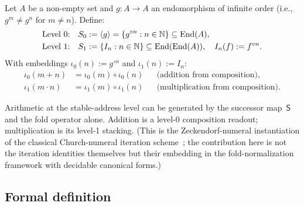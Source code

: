 \begin{theorem}
\label{thm:two-level}
Let $A$ be a non-empty set and $g \colon A \to A$ an endomorphism
of infinite order (i.e., $g^{m} \neq g^{n}$ for $m \neq n$).
Define:
\begin{align}
  \text{Level 0:} &\quad S_{0} := \langle g \rangle
    = \{g^{\circ n} : n \in \mathbb{N}\} \subseteq \operatorname{End}(A),
    \label{eq:level0}\\
  \text{Level 1:} &\quad S_{1} := \{I_{n} : n \in \mathbb{N}\}
    \subseteq \operatorname{End}(\operatorname{End}(A)),
    \quad I_{n}(f) := f^{\circ n}.
    \label{eq:level1}
\end{align}
With embeddings $\iota_{0}(n) := g^{\circ n}$ and
$\iota_{1}(n) := I_{n}$:
\begin{align}
  \iota_{0}(m + n) &= \iota_{0}(m) \circ \iota_{0}(n)
    &&\text{(addition from composition)},
    \label{eq:add-from-comp}\\
  \iota_{1}(m \cdot n) &= \iota_{1}(m) \circ \iota_{1}(n)
    &&\text{(multiplication from composition)}.
    \label{eq:mul-from-comp}
\end{align}
\end{theorem}

\begin{corollary}
\label{cor:minimal}
Arithmetic at the stable-address level can be generated by the
successor map~$\mathsf{S}$ and the fold operator alone.
Addition is a level-0 composition readout; multiplication
is its level-1 stacking.
(This is the Zeckendorf-numeral instantiation of the classical
Church-numeral iteration scheme~\cite{Church1936};
the contribution here is not the iteration identities themselves
but their embedding in the fold-normalization framework with
decidable canonical forms.)
\end{corollary}

\subsection{Formal definition}

